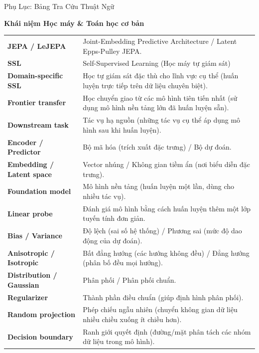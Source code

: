 \documentclass[aspectratio=169,9pt]{beamer}
\begin{document}
\begin{frame}[allowframebreaks]{Phụ Lục: Bảng Tra Cứu Thuật Ngữ}
  \begin{primarybox}
  \footnotesize \textbf{Khái niệm Học máy \& Toán học cơ bản}
  \end{primarybox}
  \vspace{0.5em}
  {\scriptsize
  \renewcommand{\arraystretch}{1.4}
  \begin{tabular}{@{} >{\bfseries\color{mprimary}}l p{10.5cm} @{}}
    JEPA / LeJEPA & Joint-Embedding Predictive Architecture / Latent Epps-Pulley JEPA. \\
    SSL & Self-Supervised Learning (Học máy tự giám sát)\\
    Domain-specific SSL & Học tự giám sát đặc thù cho lĩnh vực cụ thể (huấn luyện trực tiếp trên dữ liệu chuyên biệt). \\
    Frontier transfer & Học chuyển giao từ các mô hình tiên tiến nhất (sử dụng mô hình nền tảng lớn đã huấn luyện sẵn). \\
    Downstream task & Tác vụ hạ nguồn (những tác vụ cụ thể áp dụng mô hình sau khi huấn luyện). \\
    Encoder / Predictor & Bộ mã hóa (trích xuất đặc trưng) / Bộ dự đoán. \\
    Embedding / Latent space & Vector nhúng / Không gian tiềm ẩn (nơi biểu diễn đặc trưng). \\
    Foundation model & Mô hình nền tảng (huấn luyện một lần, dùng cho nhiều tác vụ). \\
    Linear probe & Đánh giá mô hình bằng cách huấn luyện thêm một lớp tuyến tính đơn giản. \\
    Bias / Variance & Độ lệch (sai số hệ thống) / Phương sai (mức độ dao động của dự đoán). \\
    Anisotropic / Isotropic & Bất đẳng hướng (các hướng không đều) / Đẳng hướng (phân bố đều mọi hướng). \\
    Distribution / Gaussian & Phân phối / Phân phối chuẩn. \\
    Regularizer & Thành phần điều chuẩn (giúp định hình phân phối). \\
    Random projection & Phép chiếu ngẫu nhiên (chuyển không gian dữ liệu nhiều chiều xuống ít chiều hơn). \\
    Decision boundary & Ranh giới quyết định (đường/mặt phân tách các nhóm dữ liệu trong mô hình). \\
  \end{tabular}
  }


\end{frame}
\end{document}
